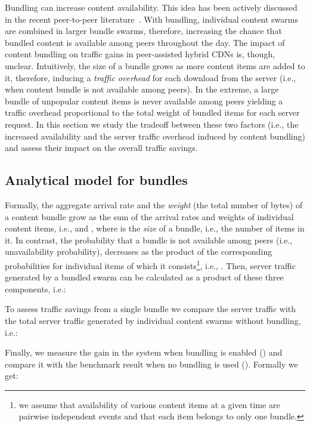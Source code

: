 \documentclass[10pt, conference, letterpaper]{IEEEtran}
\begin{document}
Bundling can increase content availability. This idea has been actively discussed in the recent peer-to-peer literature~\cite{menasche2013content, lev2010dynamic, zhang2012dynamic, carlsson2010using, carlsson2012tradeoffs}. With bundling, individual content swarms are combined in larger bundle swarms, therefore, increasing the chance that bundled content is available among peers throughout the day. The impact of content bundling on traffic gains in peer-assisted hybrid CDNs is, though, unclear. Intuitively, the size of a bundle grows as more content items are added to it, therefore, inducing a \emph{traffic overhead} for each download from the server (i.e., when content bundle is not available among peers). In the extreme, a large bundle of unpopular content items is never available among peers yielding a traffic overhead proportional to the total weight of bundled items for each server request. In this section we study the tradeoff between these two factors (i.e., the increased availability and the server traffic overhead induced by content bundling) and assess their impact on the overall traffic savings. 

\subsection{Analytical model for bundles}

Formally, the aggregate arrival rate  and the \emph{weight} (the total number of bytes)  of a content bundle grow as the sum of  the arrival rates and weights  of individual content items, i.e.,  and , where  is the \emph{size} of a bundle, i.e., the number of items in it. In contrast, the probability that a bundle is not available among peers (i.e., unavailability probability), decreases as the product of the corresponding probabilities  for individual items of which it consists\footnote{we assume that availability of various content items at a given time are pairwise independent events and that each item belongs to only one bundle.}, i.e., .  Then, server traffic  generated by a bundled swarm  can be calculated as a product of these three components, i.e.:
 
   

To assess traffic savings from a single bundle we compare the server traffic  with the total server traffic generated by individual content swarms without bundling, i.e.:  

   

Finally, we measure the gain in the system when bundling is enabled () and compare it with the benchmark result when no bundling is used (). Formally we get:
\end{document}
